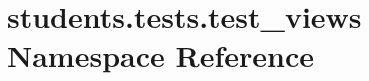 \hypertarget{namespacestudents_1_1tests_1_1test__views}{\section{students.\-tests.\-test\-\_\-views Namespace Reference}
\label{namespacestudents_1_1tests_1_1test__views}
}
